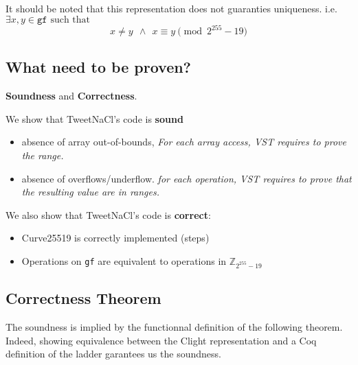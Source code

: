 It should be noted that this representation does not guaranties uniqueness. i.e.\\
$\exists x,y \in \texttt{gf} \text{ such that }$
\vspace{-0.25cm}
  $$x \neq y\ \ \land\ \ x \equiv y \pmod{2^{255}-19}$$

\subsection{What need to be proven?}

\textbf{Soundness} and \textbf{Correctness}.

We show that TweetNaCl's code is \textbf{sound} \ie

\begin{itemize}
\item absence of array out-of-bounds,
\textit{For each array access, VST requires to prove the range.}
\item absence of overflows/underflow.
\textit{for each operation, VST requires to prove that the resulting value are in ranges.}
\end{itemize}

We also show that TweetNaCl's code is \textbf{correct}:

\begin{itemize}
\item Curve25519 is correctly implemented (steps)
\item Operations on \texttt{gf} are equivalent to operations in $\mathbb{Z}_{2^{255}-19}$
\end{itemize}

\subsection{Correctness Theorem}

The soundness is implied by the functionnal definition of the following theorem.
Indeed, showing equivalence between the Clight representation and a Coq
definition of the ladder garantees us the soundness.

